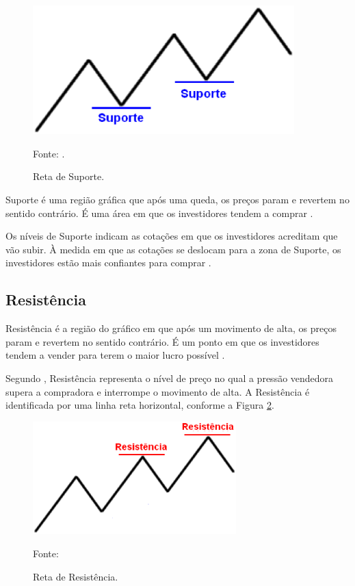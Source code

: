 \begin{figure}[H]
\centering
\includegraphics[width=0.9\textwidth]{figuras/retaSuporte}
\caption{Reta de Suporte.}{Fonte: .}
\label{retaSuporte}
\end{figure}

Suporte é uma região gráfica que após uma queda, os preços param e revertem no sentido contrário. É uma área em que os investidores tendem a comprar \cite[p~97]{debastini2008}.

Os níveis de Suporte indicam as cotações em que os investidores acreditam que vão subir. À medida em que as cotações se deslocam para a zona de Suporte, os investidores estão mais confiantes para comprar \cite{collins2012}.

\subsection{Resistência}

Resistência é a região do gráfico em que após um movimento de alta, os preços param e revertem no sentido contrário. É um ponto em que os investidores tendem a vender para terem o maior lucro possível \cite[pág.~98]{debastini2008}.

Segundo , Resistência representa o nível de preço no qual a pressão vendedora supera a compradora e interrompe o movimento de alta. A Resistência é identificada por uma linha reta horizontal, conforme a Figura \ref{retaResistencia}.

\begin{figure}[H]
\centering
\includegraphics[width=0.7\textwidth]{figuras/retaResistencia}
\caption{Reta de Resistência.}{Fonte: } 
\label{retaResistencia}
\end{figure}

